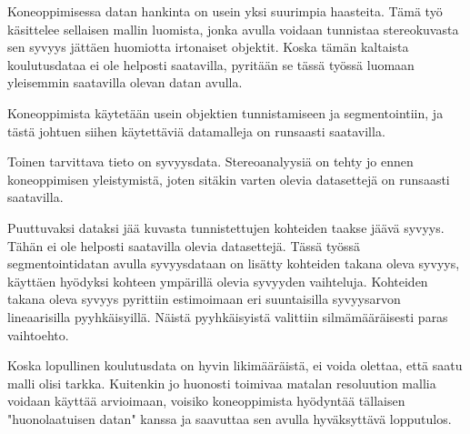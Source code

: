 Koneoppimisessa datan hankinta on usein yksi suurimpia haasteita. 
Tämä työ käsittelee sellaisen mallin luomista, jonka avulla voidaan tunnistaa stereokuvasta sen syvyys jättäen huomiotta irtonaiset objektit.
Koska tämän kaltaista koulutusdataa ei ole helposti saatavilla, pyritään se tässä työssä luomaan yleisemmin saatavilla olevan datan avulla. 

Koneoppimista käytetään usein objektien tunnistamiseen ja segmentointiin, ja tästä johtuen siihen käytettäviä datamalleja on runsaasti saatavilla.

Toinen tarvittava tieto on syvyysdata. 
Stereoanalyysiä on tehty jo ennen koneoppimisen yleistymistä, joten sitäkin varten olevia datasettejä on runsaasti saatavilla. 

Puuttuvaksi dataksi jää kuvasta tunnistettujen kohteiden taakse jäävä syvyys. Tähän ei ole helposti saatavilla olevia datasettejä.
Tässä työssä segmentointidatan avulla syvyysdataan on lisätty kohteiden takana oleva syvyys, käyttäen hyödyksi kohteen ympärillä olevia syvyyden vaihteluja.
Kohteiden takana oleva syvyys pyrittiin estimoimaan eri suuntaisilla syvyysarvon lineaarisilla pyyhkäisyillä.
Näistä pyyhkäisyistä valittiin silmämääräisesti paras vaihtoehto.

Koska lopullinen koulutusdata on hyvin likimääräistä, ei voida olettaa, että saatu malli olisi tarkka.
Kuitenkin jo huonosti toimivaa matalan resoluution mallia voidaan käyttää arvioimaan,
voisiko koneoppimista hyödyntää tällaisen "huonolaatuisen datan" kanssa ja saavuttaa sen avulla hyväksyttävä lopputulos.
